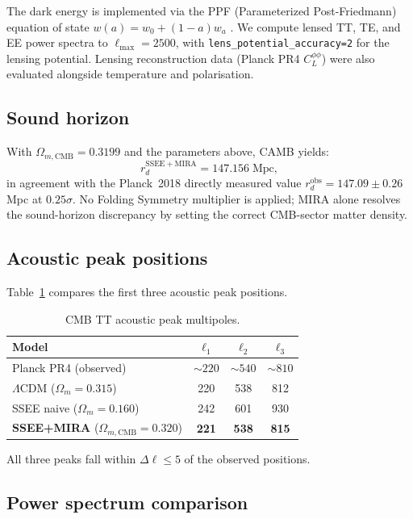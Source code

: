 \documentclass[12pt,a4paper]{article}
\begin{document}
The dark energy is implemented via the PPF (Parameterized Post-Friedmann)
equation of state $w(a)=w_0+(1-a)w_a$ \citep{Fang2008}.
We compute lensed TT, TE, and EE power spectra to $\ell_{\max}=2500$,
with \texttt{lens\_potential\_accuracy=2} for the lensing potential.
Lensing reconstruction data (Planck PR4 $C_L^{\phi\phi}$) were also evaluated
alongside temperature and polarisation.

\subsection{Sound horizon}

With $\Omega_{m,\mathrm{CMB}}=0.3199$ and the parameters above, CAMB yields:
\begin{equation}
r_d^{\mathrm{SSEE+MIRA}} = 147.156 \;\mathrm{Mpc},
\end{equation}
in agreement with the Planck~2018 directly measured value
$r_d^{\mathrm{obs}}=147.09\pm0.26$ Mpc \citep{Planck2020params} at $0.25\sigma$.
No Folding Symmetry multiplier is applied; MIRA alone resolves the sound-horizon
discrepancy by setting the correct CMB-sector matter density.

\subsection{Acoustic peak positions}

Table~\ref{tab:peaks} compares the first three acoustic peak positions.

\begin{table}[ht]
\centering
\caption{CMB TT acoustic peak multipoles.}
\label{tab:peaks}
\begin{tabular}{lccc}
\toprule
Model & $\ell_1$ & $\ell_2$ & $\ell_3$ \\
\midrule
Planck PR4 (observed) & $\sim220$ & $\sim540$ & $\sim810$ \\
$\Lambda$CDM ($\Omega_m=0.315$) & 220 & 538 & 812 \\
SSEE naive ($\Omega_m=0.160$) & 242 & 601 & 930 \\
\textbf{SSEE+MIRA} ($\Omega_{m,\mathrm{CMB}}=0.320$) & \textbf{221} & \textbf{538} & \textbf{815} \\
\bottomrule
\end{tabular}
\end{table}

All three peaks fall within $\Delta\ell\leq5$ of the observed positions.

\subsection{Power spectrum comparison}
\end{document}
